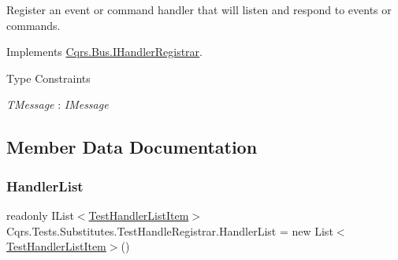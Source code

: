 Register an event or command handler that will listen and respond to events or commands. 



Implements \hyperlink{interfaceCqrs_1_1Bus_1_1IHandlerRegistrar_a07792dcc9a8b272709ff2e2dd336a642}{Cqrs.\+Bus.\+I\+Handler\+Registrar}.

\begin{Desc}
\item[Type Constraints]\begin{description}
\item[{\em T\+Message} : {\em I\+Message}]\end{description}
\end{Desc}


\subsection{Member Data Documentation}
\mbox{\label{classCqrs_1_1Tests_1_1Substitutes_1_1TestHandleRegistrar_a56823149a39f6208108030de47e70e09}} 
\subsubsection{\texorpdfstring{Handler\+List}{HandlerList}}
{\footnotesize\ttfamily readonly I\+List$<$\hyperlink{classCqrs_1_1Tests_1_1Substitutes_1_1TestHandlerListItem}{Test\+Handler\+List\+Item}$>$ Cqrs.\+Tests.\+Substitutes.\+Test\+Handle\+Registrar.\+Handler\+List = new List$<$\hyperlink{classCqrs_1_1Tests_1_1Substitutes_1_1TestHandlerListItem}{Test\+Handler\+List\+Item}$>$()\hspace{0.3cm}{\ttfamily [static]}}

